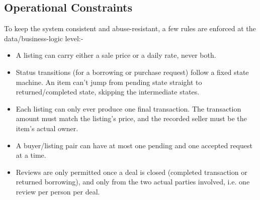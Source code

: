 \documentclass[12pt,a4paper]{article}
\begin{document}
\subsection{Operational Constraints}
To keep the system consistent and abuse-resistant, a few rules are enforced at the data/business-logic level:-%
\begin{itemize}[leftmargin=0.7cm]
    \item A listing can carry either a sale price or a daily rate, never both.
    \item Status transitions (for a borrowing or purchase request) follow a fixed state machine. An item can't jump from pending state straight to returned/completed state, skipping the intermediate states.
    \item Each listing can only ever produce one final transaction. The transaction amount must match the listing's price, and the recorded seller must be the item's actual owner.
    \item A buyer/listing pair can have at most one pending and one accepted request at a time.
    \item Reviews are only permitted once a deal is closed (completed transaction or returned borrowing), and only from the two actual parties involved, i.e. one review per person per deal.
\end{itemize}
\end{document}

